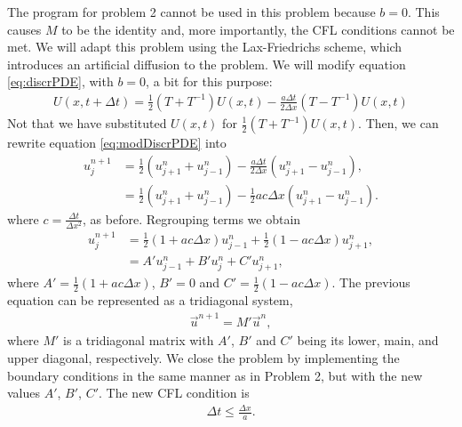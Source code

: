 \begin{questions}
\begin{solution}
\end{solution}
\begin{solution}
The program for problem 2 cannot be used in this problem because $b=0$. This causes $M$ to be the identity and, more importantly, the CFL conditions cannot be met. We will adapt this problem using the Lax-Friedrichs scheme, which introduces an artificial diffusion to the problem. We will modify equation \eqref{eq:discrPDE}, with $b=0$, a bit for this purpose:
\begin{align}\label{eq:modDiscrPDE}
U(x, t+\Delta t) =\frac{1}{2}\left(T+T^{-1}\right) U(x, t)-\frac{a\Delta t}{ 2\Delta x}(T-T^{-1})U(x,t)
\end{align}
Not that we have substituted $U(x,t)$ for $\frac{1}{2}\left(T+T^{-1}\right) U(x, t)$. Then, we can rewrite equation \eqref{eq:modDiscrPDE} into
\begin{align*}
u_j^{n+1} &= \frac{1}{2}\left(u_{j+1}^n+u_{j-1}^n\right)-\frac{a\Delta t}{2\Delta x}\left(u_{j+1}^n-u_{j-1}^n\right),\\
&= \frac{1}{2}\left(u_{j+1}^n+u_{j-1}^n\right)-\frac{1}{2}ac\Delta x\left(u_{j+1}^n-u_{j-1}^n\right).
\end{align*}
where $c = \frac{\Delta t}{\Delta x^2}$, as before. Regrouping terms we obtain
\begin{align}\label{eq:reducedForm}
u_j^{n+1} &= \frac{1}{2}\left(1+ac\Delta x\right)u_{j-1}^n+\frac{1}{2}\left(1-ac\Delta x\right)u_{j+1}^n,\nonumber\\
&= A'u_{j-1}^n + B'u_j^n + C'u_{j+1}^n,
\end{align}
where $A' = \frac{1}{2}\left(1+ac\Delta x\right)$, $B' = 0$ and $C' = \frac{1}{2}\left(1-ac\Delta x\right)$. The previous equation can be represented as a tridiagonal system,
\begin{align}\label{eq:matrixForm}
\vec{u}^{n+1} = M'\vec{u}^n,
\end{align}
where $M'$ is a tridiagonal matrix with $A'$, $B'$ and $C'$ being its lower, main, and upper diagonal, respectively. We close the problem by implementing the boundary conditions in the same manner as  in Problem 2, but with the new values $A'$, $B'$, $C'$. The new CFL condition is 
\begin{align*}
\Delta t\leq\frac{\Delta x}{a}.
\end{align*}


\end{solution}
\end{questions}
